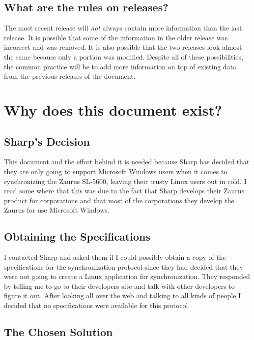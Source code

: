     \subsection{What are the rules on releases?}

    The most recent release will \emph{not} always contain more
    information than the last release. It is possible that some
    of the information in the older release was incorrect and was removed.
    It is also possible that the two releases look almost the same because
    only a portion was modified.
    Despite all of these possibilities, the common practice will
    be to add more information on top of existing
    data from the previous releases of the document.

\section{Why does this document exist?}

    \subsection{Sharp's Decision}

    This document and the effort behind it is needed because Sharp has
    decided that they are only going to support Microsoft Windows users
    when it comes to synchronizing the Zaurus SL-5600, leaving their
    trusty Linux users out in cold. I read some where that this was due
    to the fact that Sharp develops their Zaurus product for corporations and
    that most of the corporations they develop the Zaurus for use Microsoft
    Windows.

    \subsection{Obtaining the Specifications}

    I contacted Sharp and asked them if I could possibly obtain a copy of
    the specifications for the synchronization protocol since they had
    decided that they were not going to create a Linux application for
    synchronization. They responded by telling me to go to their
    developers site and talk with other developers to figure it out. After
    looking all over the web and talking to all kinds of people I
    decided that no specifications were available for this protocol.

    \subsection{The Chosen Solution}

